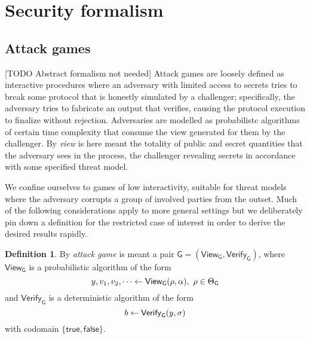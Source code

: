 \documentclass[psamsfonts, reqno]{amsart}
\theoremstyle{definition}
\newtheorem{defn}[thm]{Definition}
\theoremstyle{remark}
\numberwithin{equation}{section}
\begin{document}
\section{Security formalism}\label{section_security_formalism}

\subsection{Attack games}\label{section_concrete_attack_games}

[TODO Abstract formalism not needed]
Attack games are loosely defined as interactive
procedures where an adversary
with limited access to secrets tries to break some protocol
that is honestly simulated by a challenger;
specifically, the adversary tries to fabricate an
output that verifies, causing the protocol execution
to finalize without rejection.
Adversaries are modelled as probabilistc
algorithms of certain time complexity
that consume the view generated for them by the challenger.
By \textit{view} is here meant the totality of public and secret
quantities that the adversary sees in the process,
the challenger revealing secrets in accordance with some
specified threat model.

We confine ourselves to games of low interactivity,
suitable for threat models where the adversary corrupts
a group of involved parties from the outset.
Much of the following considerations apply
to more general settings but
we deliberately pin down a definition
for the restricted case of interest in order to
derive the desired results rapidly.

\begin{defn}\label{defn_attack_game}
By \textit{attack game} is meant a pair
$\mathsf{G} = (\mathsf{View}_\mathsf{G}, \mathsf{Verify}_\mathsf{G})$,
where $\mathsf{View}_\mathsf{G}$ is a probabilistic algorithm
of the form
\vspace{2pt}
\begin{equation}
y, v_1, v_2, \dots \leftarrow
\mathsf{View}_\mathsf{G}(\rho, \alpha),
\ \rho \in \Theta_\mathsf{G}
\vspace{2pt}
\end{equation}
and $\mathsf{Verify}_\mathsf{G}$
is a deterministic algorithm of the form
\vspace{3pt}
\begin{equation}
b \leftarrow
\mathsf{Verify}_\mathsf{G}\hspace{0pt}(y, \sigma)
\vspace{-2pt}
\end{equation}
with codomain $\{\mathsf{true}, \mathsf{false}\}$.
\end{defn}
\end{document}

